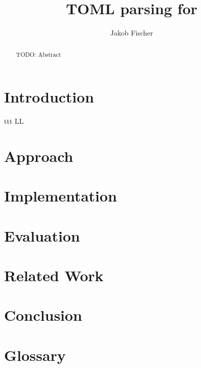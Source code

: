 \documentclass[12pt]{report}
\title{TOML parsing for  }
\author{Jakob Fischer}
\begin{document}
\maketitle

\begin{abstract}
TODO: Abstract
\end{abstract}

\chapter*{Introduction}
ttt
\acrshort{LL}

\chapter*{Approach}

\chapter*{Implementation}

\chapter*{Evaluation}

\chapter*{Related Work}

\chapter*{Conclusion}

\chapter*{Glossary}

\printglossary[type=\acronymtype]


\end{document}
